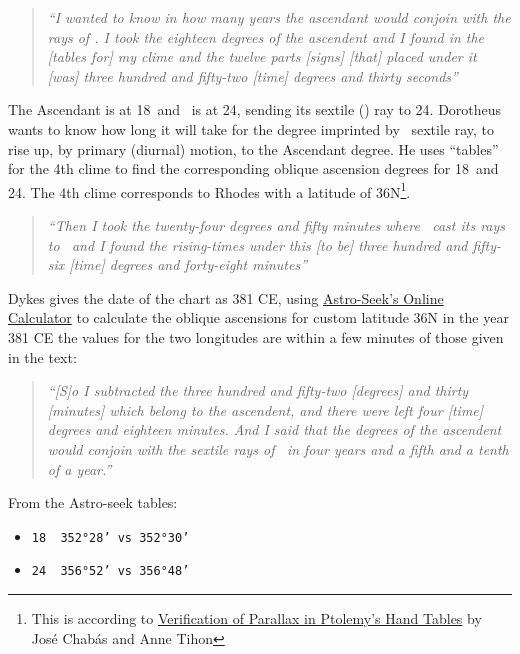 \begin{quote}
\textsl{``I wanted to know in how many years the ascendant would conjoin with the rays of \Mars. I took the eighteen degrees of the ascendent and I found in the [tables for] my clime and the twelve parts [signs] [that] placed under it [was] three hundred and fifty-two [time] degrees and thirty seconds''}
\end{quote}

The Ascendant is at 18\Pisces\, and \Mars\, is at 24, sending its sextile (\Sextile) ray to 24. Dorotheus wants to know how long it will take for the degree imprinted by \Mars\, sextile ray, to rise up, by primary (diurnal) motion, to the Ascendant degree. He uses ``tables'' for the 4th clime to find the corresponding oblique ascension degrees for 18\Pisces\, and 24. The 4th clime corresponds to Rhodes with a latitude of 36N\footnote{This is according to \href{https://journals.sagepub.com/doi/10.1177/002182869302400105}{Verification of Parallax in Ptolemy's Hand Tables} by José Chabás and Anne Tihon }.

\begin{quote}
\textsl{``Then  I took the twenty-four degrees and fifty minutes where \Mars\, cast its rays to \Pisces\, and I found the rising-times under this [to be] three hundred and fifty-six [time] degrees and forty-eight minutes''}
\end{quote}

Dykes gives the date of the chart as 381 CE, using \href{https://horoscopes.astro-seek.com/calculate-ascensional-rising-times/?latitude=100&narozeni_lat_custom_stupne=36&narozeni_lat_custom_minuty=0&narozeni_lat_custom_smer=0&narozeni_rok=381&aya=&oa=4&decimal=1}{Astro-Seek's Online Calculator} to calculate the oblique ascensions for custom latitude 36N in the year 381 CE the values for the two longitudes are within a few minutes of those given in the text:

\begin{quote}
\textsl{ ``[S]o I subtracted the three hundred and fifty-two [degrees] and thirty [minutes] which belong to the ascendent, and there were left four [time] degrees and eighteen minutes. And I said that the degrees of the ascendent would conjoin with the sextile rays of \Mars\, in four years and a fifth and a tenth of a year.''}
\end{quote}
From the Astro-seek tables:
\begin{itemize}[topsep=0em,itemsep=0em]
\item[] \texttt{18\Pisces\,        352°28'    vs       352°30'}
\item[] \texttt{24\Pisces\,        356°52'    vs       356°48'}
\end{itemize}